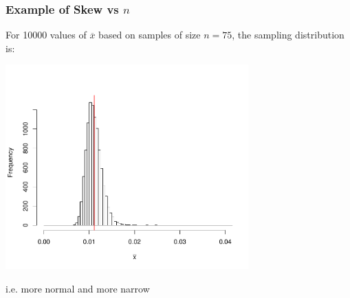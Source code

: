\documentclass[slides]{beamer}
\newcommand{\blue}[1]{\textcolor{blue2}{#1}}
\newcommand{\xbar}{\overline{x}}
\begin{document}
\begin{frame}
\frametitle{Example of Skew vs $n$}
For 10000 values of $\xbar$ based on samples of size \blue{$n=75$}, the sampling distribution is:
\begin{center}
\includegraphics[width=0.7\textwidth]{figure/hist75.pdf}
\end{center}
\blue{i.e. more normal and more narrow}
\end{frame}
\end{document}
